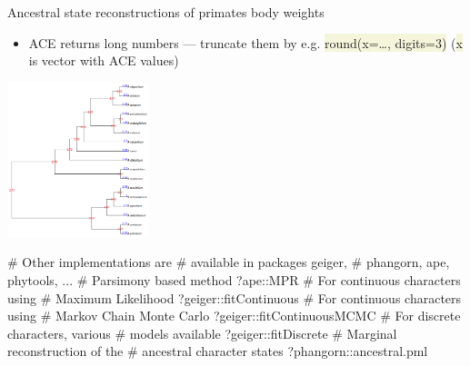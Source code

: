 \documentclass[compress, ucs, xelatex, 11pt, xcolor=svgnames, aspectratio=169,
	hyperref={
		bookmarks=true,
		unicode=true,
		colorlinks=true,
		pdftitle={Molecular data in R},
		plainpages=false,
		pdfauthor={Vojtech Zeisek},
		pdfsubject={Course about phylogeny and evolution in R},
		pdfcreator={XeLaTeX},
		pdfkeywords={R, evolution, phylogeny, molecular data},
		linkcolor=Crimson, %
		anchorcolor=Magenta, %
		citecolor=Magenta, %
		filecolor=Magenta, %
		menucolor=Magenta, %
		urlcolor=DodgerBlue, %
		pdftex},
	url={hyphens, lowtilde} %
	]{beamer}
\renewcommand{\texttt}[1]{\colorbox{Beige}{{\ttfamily #1}}}
\begin{document}
\begin{frame}[fragile]{Ancestral state reconstructions of primates body weights}
	\begin{multicols}{2}
		\begin{itemize}
			\item ACE returns long numbers --- truncate them by e.g. \texttt{round(x=\ldots, digits=3)} (\texttt{x} is vector with ACE values)
		\end{itemize}
		\begin{center}
			\includegraphics[height=4.5cm]{ace.png}
		\end{center}
		\begin{spluscode}
    # Other implementations are
    # available in packages geiger,
    # phangorn, ape, phytools, ...
    # Parsimony based method
    ?ape::MPR
    # For continuous characters using
    # Maximum Likelihood
    ?geiger::fitContinuous
    # For continuous characters using
    # Markov Chain Monte Carlo
    ?geiger::fitContinuousMCMC
    # For discrete characters, various
    # models available
    ?geiger::fitDiscrete
    # Marginal reconstruction of the
    # ancestral character states
    ?phangorn::ancestral.pml
		\end{spluscode}
	\end{multicols}
\end{frame}
\end{document}
